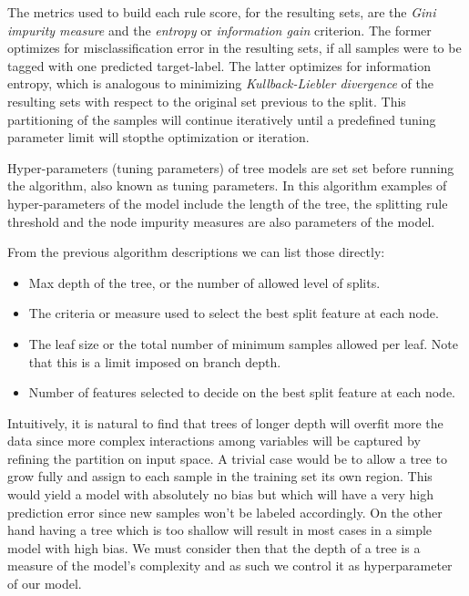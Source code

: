 \smallskip



The metrics used to build each rule score, for the resulting sets, are the \textit{Gini impurity measure} and the \textit{entropy} or \textit{information gain} criterion. The former optimizes for misclassification error in the resulting sets, if all samples were to be tagged with one predicted target-label.  The latter optimizes for information entropy, which is analogous to minimizing \textit{Kullback-Liebler divergence} of the resulting sets with respect to the original set previous to the split. This partitioning of the samples will continue iteratively until a predefined tuning parameter limit will stopthe optimization or iteration.


Hyper-parameters (tuning parameters) of tree models are set set before running the algorithm, also known as tuning parameters. In this algorithm examples of hyper-parameters of the model include the length of the tree,  the splitting rule threshold and the node impurity measures are also parameters of the model. 

From the previous algorithm descriptions we can list those directly:

\begin{itemize}
	\item Max depth of the tree, or the number of allowed level of splits.
	\item The criteria or measure used to select the best split feature at each node.
	\item The leaf size or the total number of minimum samples allowed per leaf. Note that this is a limit imposed on  branch depth. 
	\item Number of features selected to decide on the best split feature at each node.
\end{itemize}


Intuitively, it is natural to find that trees of longer depth will overfit more the data since more complex interactions among variables will be captured by refining the partition on input space. A trivial case would be to allow a tree to grow fully and assign to each sample in the training set its own region. This would yield a model with absolutely no bias but which will have a very high prediction error since new samples won't be labeled accordingly. On the other hand having a tree which is too shallow will result in most cases in a simple model with high bias. We must consider then that the depth of a tree is a measure of the model's complexity and as such we control it as hyperparameter of our model. 


